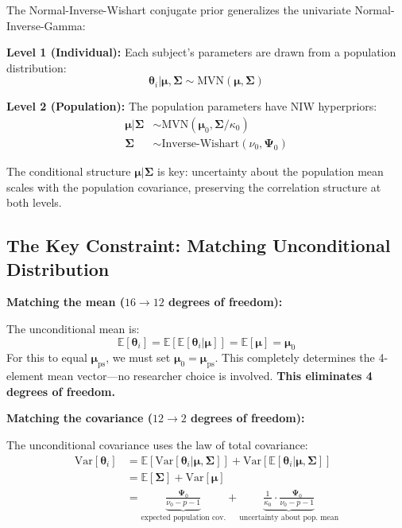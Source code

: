 \documentclass[11pt]{article}
\newcommand{\E}{\mathbb{E}}
\newcommand{\Var}{\text{Var}}
\begin{document}
The Normal-Inverse-Wishart conjugate prior generalizes the univariate Normal-Inverse-Gamma:

\textbf{Level 1 (Individual):} Each subject's parameters are drawn from a population distribution:
\[
  \boldsymbol{\theta}_i | \boldsymbol{\mu}, \boldsymbol{\Sigma} \sim \text{MVN}(\boldsymbol{\mu}, \boldsymbol{\Sigma})
\]

\textbf{Level 2 (Population):} The population parameters have NIW hyperpriors:
\begin{align}
  \boldsymbol{\mu} | \boldsymbol{\Sigma} &\sim \text{MVN}(\boldsymbol{\mu}_0, \boldsymbol{\Sigma}/\kappa_0) \\
  \boldsymbol{\Sigma} &\sim \text{Inverse-Wishart}(\nu_0, \boldsymbol{\Psi}_0)
\end{align}

The conditional structure $\boldsymbol{\mu} | \boldsymbol{\Sigma}$ is key: uncertainty about the population mean scales with the population covariance, preserving the correlation structure at both levels.

\subsection{The Key Constraint: Matching Unconditional Distribution}

\textbf{Matching the mean ($16 \to 12$ degrees of freedom):}

The unconditional mean is:
\[
  \E[\boldsymbol{\theta}_i] = \E[\E[\boldsymbol{\theta}_i | \boldsymbol{\mu}]] = \E[\boldsymbol{\mu}] = \boldsymbol{\mu}_0
\]
For this to equal $\boldsymbol{\mu}_{\text{ps}}$, we must set $\boldsymbol{\mu}_0 = \boldsymbol{\mu}_{\text{ps}}$. This completely determines the 4-element mean vector---no researcher choice is involved. \textbf{This eliminates 4 degrees of freedom.}

\textbf{Matching the covariance ($12 \to 2$ degrees of freedom):}

The unconditional covariance uses the law of total covariance:
\begin{align}
  \Var[\boldsymbol{\theta}_i] &= \E[\Var[\boldsymbol{\theta}_i | \boldsymbol{\mu}, \boldsymbol{\Sigma}]] + \Var[\E[\boldsymbol{\theta}_i | \boldsymbol{\mu}, \boldsymbol{\Sigma}]] \nonumber \\
  &= \E[\boldsymbol{\Sigma}] + \Var[\boldsymbol{\mu}] \nonumber \\
  &= \underbrace{\frac{\boldsymbol{\Psi}_0}{\nu_0 - p - 1}}_{\text{expected population cov.}} + \underbrace{\frac{1}{\kappa_0} \cdot \frac{\boldsymbol{\Psi}_0}{\nu_0 - p - 1}}_{\text{uncertainty about pop.\ mean}}
  \label{eq:niw_total_cov}
\end{align}
\end{document}
